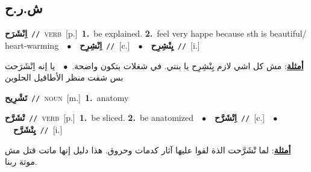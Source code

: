 \documentclass[10pt,a4paper,twoside]{article} %
\begin{document}
\begin{multicols}{2}
\vspace{-3mm}
\subsection*{\color{blue}\foreignlanguage{arabic}{ش.ر.ح}\color{blue}{}} 

{\setlength\topsep{0pt}\textbf{\foreignlanguage{arabic}{اِنْشَرَح}}\ {\color{gray}\texttt{//}\color{black}}\ \textsc{verb}\ [p.]\ \textbf{1.}~be explained.  \textbf{2.}~feel very happe because sth is beautiful/ heart-warming\ \ $\bullet$\ \ \setlength\topsep{0pt}\textbf{\foreignlanguage{arabic}{اِنْشِرِح}}\ {\color{gray}\texttt{//}\color{black}}\ [c.]\ \ $\bullet$\ \ \setlength\topsep{0pt}\textbf{\foreignlanguage{arabic}{يِنْشِرِح}}\ {\color{gray}\texttt{//}\color{black}}\ [i.]\  \begin{flushright}\color{gray}\foreignlanguage{arabic}{\textbf{\underline{\foreignlanguage{arabic}{أمثلة}}}: مش كل اشي لازم يِنْشِرِح يا بنتي. في شغلات بتكون واضحة.\ $\bullet$\ \  يا إنه اِنْشَرَحت بس شفت منظر الأطافيل الحلوين}\end{flushright}\color{black}} \vspace{2mm}

{\setlength\topsep{0pt}\textbf{\foreignlanguage{arabic}{تَشْرِيح}}\ {\color{gray}\texttt{//}\color{black}}\ \textsc{noun}\ [m.]\ \textbf{1.}~anatomy\ } \vspace{2mm}

{\setlength\topsep{0pt}\textbf{\foreignlanguage{arabic}{تْشَرَّح}}\ {\color{gray}\texttt{//}\color{black}}\ \textsc{verb}\ [p.]\ \textbf{1.}~be sliced.  \textbf{2.}~be anatomized\ \ $\bullet$\ \ \setlength\topsep{0pt}\textbf{\foreignlanguage{arabic}{اِتْشَرَّح}}\ {\color{gray}\texttt{//}\color{black}}\ [c.]\ \ $\bullet$\ \ \setlength\topsep{0pt}\textbf{\foreignlanguage{arabic}{يِتْشَرَّح}}\ {\color{gray}\texttt{//}\color{black}}\ [i.]\  \begin{flushright}\color{gray}\foreignlanguage{arabic}{\textbf{\underline{\foreignlanguage{arabic}{أمثلة}}}: لما تْشَرَّحت الذة لقوا عليها آثار كدمات وحروق. هذا دليل إنها ماتت قتل مش موتة ربنا.}\end{flushright}\color{black}} \vspace{2mm}


\end{multicols}
\end{document}
